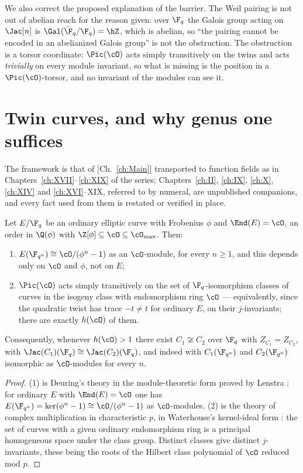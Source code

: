 \begin{summary}
We also correct the proposed explanation of the barrier. The Weil pairing is not out of
abelian reach for the reason given: over $\F_q$ the Galois group acting on $\Jac[n]$ is
$\Gal(\bar\F_q/\F_q)=\hZ$, which is abelian, so ``the pairing cannot be encoded in an
abelianized Galois group'' is not the obstruction. The obstruction is a torsor coordinate:
$\Pic(\cO)$ acts simply transitively on the twins and acts \emph{trivially} on every module
invariant, so what is missing is the position in a $\Pic(\cO)$-torsor, and no invariant of
the modules can see it.
\end{summary}


\section{Twin curves, and why genus one suffices}

The framework is that of [Ch.~\ref{ch:Main}] transported to function fields as in Chapters~\ref{ch:XVII}--\ref{ch:XIX}
of the series; Chapters~\ref{ch:II}, \ref{ch:IX}, \ref{ch:X}, \ref{ch:XIV} and \ref{ch:XVI}--XIX, referred to by numeral, are unpublished
companions, and every fact used from them is restated or verified in place.

\begin{theorem}\label{XX:thm:twins}
Let $E/\F_q$ be an ordinary elliptic curve with Frobenius $\phi$ and $\End(E)=\cO$, an order
in $\Q(\phi)$ with $\Z[\phi]\subseteq\cO\subseteq\cO_{\max}$. Then:
\begin{enumerate}
\item $E(\F_{q^n})\cong\cO/(\phi^n-1)$ as an $\cO$-module, for every $n\ge1$, and this
depends only on $\cO$ and $\phi$, not on $E$;
\item $\Pic(\cO)$ acts simply transitively on the set of $\F_q$-isomorphism classes of
curves in the isogeny class with endomorphism ring $\cO$ --- equivalently, since the
quadratic twist has trace $-t\ne t$ for ordinary $E$, on their $j$-invariants; there are
exactly $h(\cO)$ of them.
\end{enumerate}
Consequently, whenever $h(\cO)>1$ there exist $C_1\not\cong C_2$ over $\F_q$ with
$Z_{C_1}=Z_{C_2}$, with $\Jac(C_1)(\F_q)\cong\Jac(C_2)(\F_q)$, and indeed with
$C_1(\F_{q^n})$ and $C_2(\F_{q^n})$ isomorphic as $\cO$-modules for every $n$.
\end{theorem}

\begin{proof}
(1) is Deuring's theory \cite{Deuring} in the module-theoretic form proved by Lenstra
\cite{Lenstra}: for ordinary $E$ with $\End(E)=\cO$ one has
$E(\F_{q^n})=\ker(\phi^n-1)\cong\cO/(\phi^n-1)$ as $\cO$-modules. (2) is the theory of
complex multiplication in characteristic $p$, in Waterhouse's kernel-ideal form
\cite{Waterhouse}: the set of curves with a given ordinary endomorphism ring is a principal
homogeneous space under the class group. Distinct classes give distinct $j$-invariants, these
being the roots of the Hilbert class polynomial of $\cO$ reduced mod $p$.
\end{proof}

